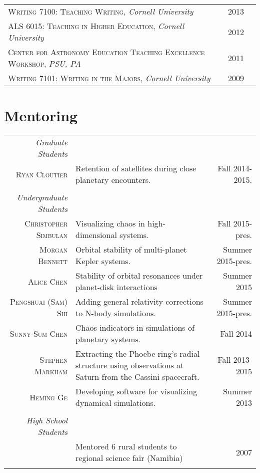 \documentclass[10pt]{article} %
\begin{document}
\begin{tabular}{l>{\hfill}p{1.8cm}r}
\textsc{Writing 7100:  Teaching Writing}, {\it Cornell University} & 2013 \\
\textsc{ALS 6015:  Teaching in Higher Education}, {\it Cornell University} & 2012\\
\textsc{Center for Astronomy Education Teaching Excellence Workshop}, {\it PSU, PA} & 2011 \\
\textsc{Writing 7101: Writing in the Majors}, {\it Cornell University} & 2009 \\
\end{tabular}



\section{Mentoring}

\begin{tabular}{r|p{9.3cm}r}

{\it Graduate Students} \\
\textsc{Ryan Cloutier} & Retention of satellites during close planetary encounters. & Fall 2014-2015. \\
\\
{\it Undergraduate Students} \\
\textsc{Christopher Simbulan} & Visualizing chaos in high-dimensional systems. & Fall 2015-pres. \\
\textsc{Morgan Bennett} & Orbital stability of multi-planet Kepler systems. & Summer 2015-pres. \\
\textsc{Alice Chen} & Stability of orbital resonances under planet-disk interactions & Summer 2015 \\
\textsc{Pengshuai (Sam) Shi} & Adding general relativity corrections to N-body simulations. & Summer 2015-pres. \\
\textsc{Sunny-Sum Chen} & Chaos indicators in simulations of planetary systems. & Fall 2014 \\
\textsc{Stephen Markham} & Extracting the Phoebe ring's radial structure using observations at Saturn from the Cassini spacecraft.  & Fall 2013-2015 \\
\textsc{Heming Ge} & Developing software for visualizing dynamical simulations. & Summer 2013 \\
\\
{\it High School Students} \\
& Mentored 6 rural students to regional science fair (Namibia) & 2007 \\
\multicolumn{3}{c}{} \\
\end{tabular}
\end{document}
